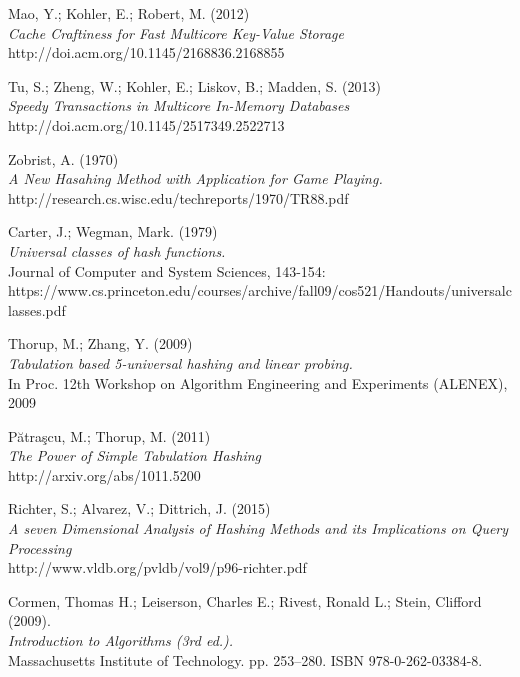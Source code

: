 \documentclass[11pt]{article} %
\begin{document}
\begin{thebibliography}{99}

 Mao, Y.; Kohler, E.; Robert, M. (2012) \\
 \emph{Cache Craftiness for Fast Multicore Key-Value Storage}\\
 http://doi.acm.org/10.1145/2168836.2168855

 Tu, S.; Zheng, W.; Kohler, E.; Liskov, B.; Madden, S. (2013) \\
 \emph{Speedy Transactions in Multicore In-Memory Databases} \\
 http://doi.acm.org/10.1145/2517349.2522713

 Zobrist, A. (1970)\\
 \emph{A New Hasahing Method with Application for Game Playing.}\\
 http://research.cs.wisc.edu/techreports/1970/TR88.pdf

 Carter, J.; Wegman, Mark. (1979)\\
 \emph{Universal classes of hash functions.}\\
 Journal of Computer and System Sciences, 143-154:\\
 https://www.cs.princeton.edu/courses/archive/fall09/cos521/Handouts/universalclasses.pdf

 Thorup, M.; Zhang, Y. (2009)\\
 \emph{Tabulation based 5-universal hashing and linear probing.}\\
 In Proc. 12th Workshop on Algorithm Engineering and Experiments (ALENEX), 2009

 Pătraşcu, M.; Thorup, M. (2011)\\
 \emph{The Power of Simple Tabulation Hashing}\\
 http://arxiv.org/abs/1011.5200

 Richter, S.; Alvarez, V.; Dittrich, J. (2015)\\
 \emph{A seven Dimensional Analysis of Hashing Methods and its Implications on Query Processing}\\
 http://www.vldb.org/pvldb/vol9/p96-richter.pdf

 Cormen, Thomas H.; Leiserson, Charles E.; Rivest, Ronald L.; Stein, Clifford (2009). \\
 \emph{Introduction to Algorithms (3rd ed.).} \\
 Massachusetts Institute of Technology. pp. 253–280. ISBN 978-0-262-03384-8.


\end{thebibliography}
\end{document}

